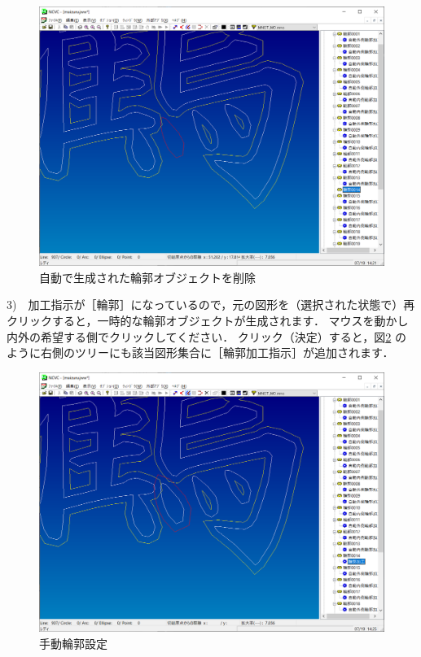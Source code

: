 \begin{figure}[H]
\centering
\includegraphics[scale=0.5]{No3/fig/inout2.png}
\caption{自動で生成された輪郭オブジェクトを削除}
\label{fig:inout2.png}
\end{figure}

\newpage
3)　加工指示が［輪郭］になっているので，元の図形を（選択された状態で）再クリックすると，一時的な輪郭オブジェクトが生成されます．
マウスを動かし内外の希望する側でクリックしてください．
クリック（決定）すると，図\ref{fig:inout3.png} のように右側のツリーにも該当図形集合に［輪郭加工指示］が追加されます．

\begin{figure}[H]
\centering
\includegraphics[scale=0.5]{No3/fig/inout3.png}
\caption{手動輪郭設定}
\label{fig:inout3.png}
\end{figure}


